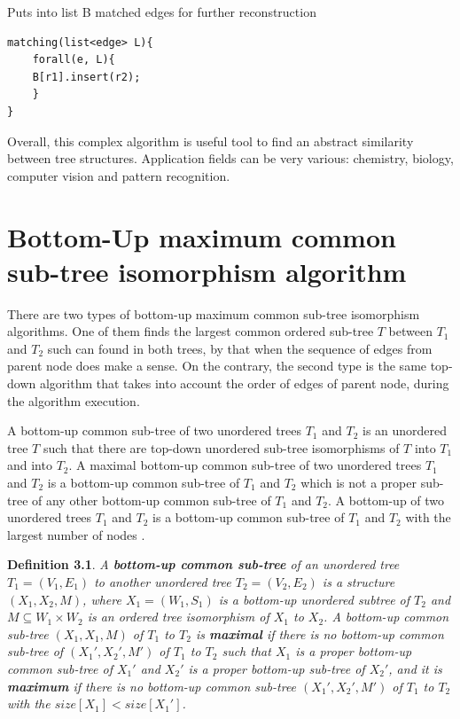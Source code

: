 \documentclass{report}
\begin{document}
Puts into list B matched edges for further reconstruction
\begin{lstlisting}
matching(list<edge> L){
	forall(e, L){
	B[r1].insert(r2);
	}
}
\end{lstlisting}

Overall, this complex algorithm is useful tool to find an abstract similarity between tree structures. Application fields can be very various: chemistry, biology, computer vision and pattern recognition.

\section{Bottom-Up maximum common sub-tree isomorphism algorithm }
\label{sec:bottomup}

There are two types of bottom-up maximum common sub-tree isomorphism algorithms. One of them finds the largest common ordered sub-tree $T$ between $ T_{1}$ and $ T_{2}$ such can found in both trees, by that when the sequence of edges from parent node does make a sense. On the contrary, the second type is the same top-down algorithm that takes into account the order of edges of parent node, during the algorithm execution. 

A bottom-up common sub-tree of two unordered trees $ T_{1}$ and $ T_{2 }$ is an unordered tree $T$ such that there are top-down unordered sub-tree isomorphisms of $ T$ into $ T_{1}$ and into $ T_{2}$. A maximal bottom-up common sub-tree of two unordered  trees $ T_{1}$ and $ T_{2}$ is a bottom-up common sub-tree of $ T_{1}$ and $ T_{2}$ which is not a proper sub-tree of any other bottom-up common sub-tree of $ T_{1}$ and $ T_{2}$. A bottom-up of two unordered trees $ T_{1}$ and $ T_{2}$ is a bottom-up common sub-tree of $ T_{1}$ and $ T_{2}$ with the largest number of nodes \cite{valiente}.

\textbf{Definition 3.1}. \emph{
A \textbf{bottom-up common sub-tree} of an unordered tree $ T_{1} = ( V_{1}, E_{1})$ to another unordered tree $ T_{2} = ( V_{2}, E_{2})$ is a structure 
$ (X_{1}, X_{2}, M)$, where $ X_{1} = (W_{1}, S_{1})$ is a bottom-up unordered subtree of $ T_{2}$ and $M \subseteq W_{1} \times  W_{2}$ is an ordered tree isomorphism of $ X_{1}$ to $ X_{2}$. A bottom-up common sub-tree $ (X_{1}, X_{1}, M)$ of $ T_{1}$ to $ T_{2}$ is \textbf{maximal} if there is no bottom-up common sub-tree of $ (X_{1}', X_{2}', M')$ of $ T_{1}$ to $ T_{2}$ such that $ X_{1}$  is a proper bottom-up common sub-tree of $ X_{1}'$ and $ X_{2}'$ is a proper bottom-up sub-tree of $ X_{2}'$, and it is \textbf{maximum} if there is no bottom-up common sub-tree $ (X_{1}', X_{2}', M')$  of $ T_{1}$ to $ T_{2}$ with the $size[X_{1}] < size[X_{1}']$\cite{valiente}.
}
\end{document}
